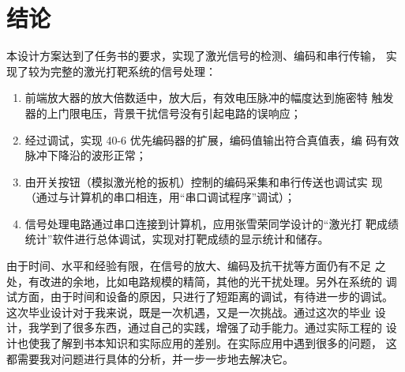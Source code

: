 \chapter{结论}

本设计方案达到了任务书的要求，实现了激光信号的检测、编码和串行传输，
实现了较为完整的激光打靶系统的信号处理：
\begin{enumerate}
  \item 前端放大器的放大倍数适中，放大后，有效电压脉冲的幅度达到施密特
  触发器的上门限电压，背景干扰信号没有引起电路的误响应；
  \item 经过调试，实现 40-6 优先编码器的扩展，编码值输出符合真值表，编
  码有效脉冲下降沿的波形正常；
  \item 由开关按钮（模拟激光枪的扳机）控制的编码采集和串行传送也调试实
  现（通过与计算机的串口相连，用``串口调试程序''调试）；
  \item 信号处理电路通过串口连接到计算机，应用张雪荣同学设计的``激光打
  靶成绩统计''软件进行总体调试，实现对打靶成绩的显示统计和储存。
\end{enumerate}

由于时间、水平和经验有限，在信号的放大、编码及抗干扰等方面仍有不足
之处，有改进的余地，比如电路规模的精简，其他的光干扰处理。另外在系统的
调试方面，由于时间和设备的原因，只进行了短距离的调试，有待进一步的调试。
这次毕业设计对于我来说，既是一次机遇，又是一次挑战。通过这次的毕业
设计，我学到了很多东西，通过自己的实践，增强了动手能力。通过实际工程的
设计也使我了解到书本知识和实际应用的差别。在实际应用中遇到很多的问题，
这都需要我对问题进行具体的分析，并一步一步地去解决它。